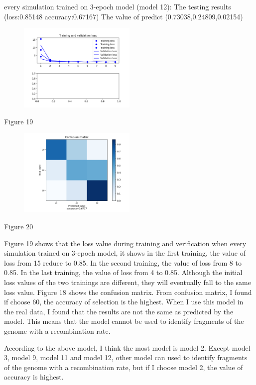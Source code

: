 \documentclass[11pt,a4 paper,title page]{article}
\begin{document}
every simulation trained on 3-epoch model (model 12):
\hfill\break 
The testing results (loss:0.85148 accuracy:0.67167)
\hfill\break 
The value of predict (0.73038,0.24809,0.02154)
\begin{figure}[H]
\centering
\includegraphics[width=0.5\textwidth,angle=360]{../picture/figure19.png}
\end{figure}
\centerline{Figure 19}
\hfill\break 
\begin{figure}[H]
\centering
\includegraphics[width=0.5\textwidth,angle=360]{../picture/figure20.png}
\end{figure}
\centerline{Figure 20}
\hfill\break
Figure 19 shows that the loss value during training and verification when every simulation trained on 3-epoch model, it shows in the first training, the value of loss from 15 reduce to 0.85. In the second training, the value of loss from 8 to 0.85. In the last training, the value of loss from 4 to 0.85. Although the initial loss values of the two trainings are different, they will eventually fall to the same loss value. Figure 18 shows the confusion matrix. From confusion matrix, I found if choose 60, the accuracy of selection is the highest. When I use this model in the real data, I found that the results are not the same as predicted by the model. This means that the model cannot be used to identify fragments of the genome with a recombination rate.
\hfill\break  

According to the above model, I think the most model is model 2. Except model 3, model 9, model 11 and model 12, other model can used to identify fragments of the genome with a recombination rate, but if I choose model 2, the value of accuracy is highest.  
\hfill\break  
\end{document}
